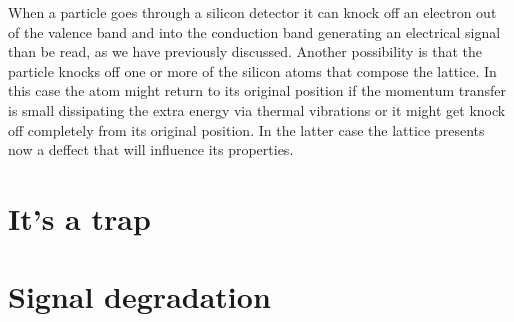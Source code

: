 When a particle goes through a silicon detector it can knock off an electron out of the valence band and into the conduction band generating an electrical signal than be read, as we have previously discussed. Another possibility is that the particle knocks off one or more of the silicon atoms that compose the lattice. In this case the atom might return to its original position if the momentum transfer is small dissipating the extra energy via thermal vibrations or it might get knock off completely from its original position. In the latter case the lattice presents now a deffect that will influence its properties.

\section{It's a trap}

\section{Signal degradation}
